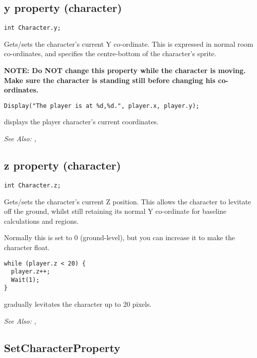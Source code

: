 \subsection{y property (character)}\label{Character.y}%

\begin{verbatim}
int Character.y;
\end{verbatim}

Gets/sets the character's current Y co-ordinate. This is expressed in normal room
co-ordinates, and specifies the centre-bottom of the character's sprite.

\bf{NOTE:} Do \bf{NOT} change this property while the character is moving. Make
sure the character is standing still before changing his co-ordinates.

\begin{verbatim}
Display("The player is at %d,%d.", player.x, player.y);
\end{verbatim}
displays the player character's current coordinates.

\it{See Also:} ,


\subsection{z property (character)}\label{Character.z}%

\begin{verbatim}
int Character.z;
\end{verbatim}

Gets/sets the character's current Z position. This allows the character to levitate
off the ground, whilst still retaining its normal Y co-ordinate for baseline calculations
and regions.

Normally this is set to 0 (ground-level), but you can increase it to make the character float.

\begin{verbatim}
while (player.z < 20) {
  player.z++;
  Wait(1);
}
\end{verbatim}
gradually levitates the character up to 20 pixels.

\it{See Also:} ,


\subsection{SetCharacterProperty}\label{SetCharacterProperty}%

